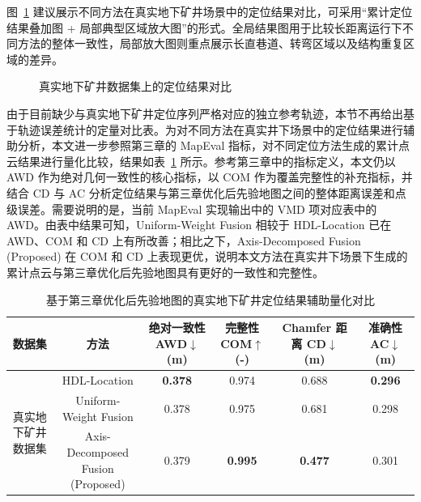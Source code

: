 图~\ref{fig:ch4_realmine_compare} 建议展示不同方法在真实地下矿井场景中的定位结果对比，可采用“累计定位结果叠加图 + 局部典型区域放大图”的形式。全局结果图用于比较长距离运行下不同方法的整体一致性，局部放大图则重点展示长直巷道、转弯区域以及结构重复区域的差异。

\begin{figure}[htbp]
    \centering
    \caption{真实地下矿井数据集上的定位结果对比}
    \label{fig:ch4_realmine_compare}
\end{figure}

由于目前缺少与真实地下矿井定位序列严格对应的独立参考轨迹，本节不再给出基于轨迹误差统计的定量对比表。为对不同方法在真实井下场景中的定位结果进行辅助分析，本文进一步参照第三章的 MapEval 指标，对不同定位方法生成的累计点云结果进行量化比较，结果如表~\ref{tab:ch4_realmine_mapeval} 所示。参考第三章中的指标定义，本文仍以 AWD 作为绝对几何一致性的核心指标，以 COM 作为覆盖完整性的补充指标，并结合 CD 与 AC 分析定位结果与第三章优化后先验地图之间的整体距离误差和点级误差。需要说明的是，当前 MapEval 实现输出中的 VMD 项对应表中的 AWD。由表中结果可知，Uniform-Weight Fusion 相较于 HDL-Location 已在 AWD、COM 和 CD 上有所改善；相比之下，Axis-Decomposed Fusion (Proposed) 在 COM 和 CD 上表现更优，说明本文方法在真实井下场景下生成的累计点云与第三章优化后先验地图具有更好的一致性和完整性。

\begin{table}[htbp]
    \centering
    \caption{基于第三章优化后先验地图的真实地下矿井定位结果辅助量化对比}
    \label{tab:ch4_realmine_mapeval}
    \small
    \begin{tabular}{cccccc}
        \toprule
        数据集 & 方法 & \shortstack{绝对一致性\\AWD$\downarrow$ (m)} & \shortstack{完整性\\COM$\uparrow$ (-)} & \shortstack{Chamfer 距离\\CD$\downarrow$ (m)} & \shortstack{准确性\\AC$\downarrow$ (m)} \\
        \midrule
        \multirow{3}{*}{真实地下矿井数据集} & HDL-Location & \textbf{0.378} & 0.974 & 0.688 & \textbf{0.296} \\
         & Uniform-Weight Fusion & 0.378 & 0.975 & 0.681 & 0.298 \\
         & \shortstack{Axis-Decomposed Fusion\\(Proposed)} & 0.379 & \textbf{0.995} & \textbf{0.477} & 0.301 \\
        \bottomrule
    \end{tabular}
\end{table}

